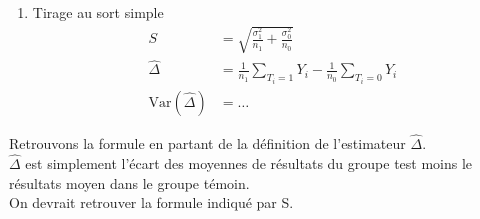 \documentclass[10pt,a4paper]{article}
\begin{document}
\begin{enumerate}
	\item Tirage au sort simple
	\begin{align*}
	S &= \sqrt{\frac{\sigma_1^2}{n_1} + \frac{\sigma_0^2}{n_0}}\\
	\hat{\Delta} &= \frac{1}{n_1} \sum_{T_i=1} Y_i - \frac{1}{n_0} \sum_{T_i = 0} Y_i 	\\
	\text{Var}(\hat{\Delta}) &= \hdots	
	\end{align*}
\end{enumerate}
Retrouvons la formule en partant de la définition de l'estimateur $\hat{\Delta}$.\\
$\hat{\Delta}$ est simplement l'écart des moyennes de résultats du groupe test moins le résultats moyen dans le groupe témoin.\\
On devrait retrouver la formule indiqué par S.
\end{document}
